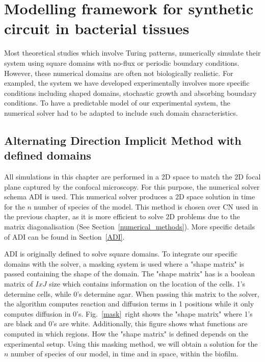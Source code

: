 \section{Modelling framework for synthetic circuit in bacterial tissues}
Most theoretical studies which involve Turing patterns, numerically simulate their system using square domains with no-flux or periodic boundary conditions.
However, these numerical domains are often not biologically realistic.
For exampled, the system we have developed experimentally involves more specific conditions including shaped domains, stochastic growth and absorbing boundary conditions.
To have a predictable model of our experimental system, the numerical solver had to be adapted to include such domain characteristics.

\subsection{Alternating Direction Implicit Method with defined domains}\label{Alternating Direction Implicit Method with defined domains}
All simulations in this chapter are performed in a \acrshort{2D} space to match the \acrshort{2D} focal plane captured by the confocal microscopy.
For this purpose, the numerical solver schema  \acrfull{ADI} is used.
This numerical solver produces a 2D space solution in time for the $n$ number of species of the model.
This method is chosen over \acrshort{CN} used in the previous chapter, as it is more efficient to solve 2D problems due to the matrix diagonalisation (See Section~\ref{numerical_methods}). More specific details of ADI can be found in Section~\ref{ADI}.



ADI is originally defined to solve square domains.
To integrate our specific domains with the solver, a masking system is used where a "shape matrix" is passed containing the shape of the domain.
The "shape matrix" has is a boolean matrix of $IxJ$ size which contains information on the location of the cells.
1's determine cells, while 0's determine agar.
When passing this matrix to the solver, the algorithm computes reaction and diffusion terms in 1 positions while it only computes diffusion in 0's.
Fig.~\ref{mask}~right shows the "shape matrix" where 1's are black and 0's are white.
Additionally, this figure shows what functions are computed in which regions.
How the "shape matrix" is defined depends on the experimental setup.
Using this masking method, we will obtain a solution for the $n$ number of species of our model, in time and in space, within the biofilm.

